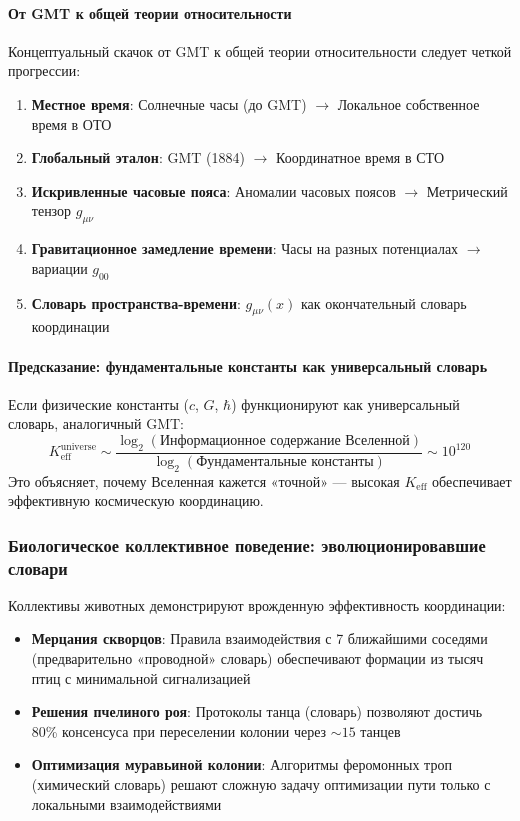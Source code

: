 \documentclass[11pt,a4paper]{article}
\begin{document}
	\paragraph{От GMT к общей теории относительности}
	Концептуальный скачок от GMT к общей теории относительности следует четкой прогрессии:
	\begin{enumerate}
		\item \textbf{Местное время}: Солнечные часы (до GMT) $\rightarrow$ Локальное собственное время в ОТО
		\item \textbf{Глобальный эталон}: GMT (1884) $\rightarrow$ Координатное время в СТО
		\item \textbf{Искривленные часовые пояса}: Аномалии часовых поясов $\rightarrow$ Метрический тензор $g_{\mu\nu}$
		\item \textbf{Гравитационное замедление времени}: Часы на разных потенциалах $\rightarrow$ вариации $g_{00}$
		\item \textbf{Словарь пространства-времени}: $g_{\mu\nu}(x)$ как окончательный словарь координации
	\end{enumerate}
	
	\paragraph{Предсказание: фундаментальные константы как универсальный словарь}
	Если физические константы ($c$, $G$, $\hbar$) функционируют как универсальный словарь, аналогичный GMT:
	\begin{equation}
		K_{\mathrm{eff}}^{\mathrm{universe}} \sim \frac{\log_2(\text{Информационное содержание Вселенной})}{\log_2(\text{Фундаментальные константы})} \sim 10^{120}
	\end{equation}
	Это объясняет, почему Вселенная кажется «точной» — высокая $K_{\mathrm{eff}}$ обеспечивает эффективную космическую координацию.
	
	\subsubsection{Биологическое коллективное поведение: эволюционировавшие словари}
	Коллективы животных демонстрируют врожденную эффективность координации:
	\begin{itemize}
		\item \textbf{Мерцания скворцов}: Правила взаимодействия с 7 ближайшими соседями (предварительно «проводной» словарь) обеспечивают формации из тысяч птиц с минимальной сигнализацией
		\item \textbf{Решения пчелиного роя}: Протоколы танца (словарь) позволяют достичь 80\% консенсуса при переселении колонии через $\sim 15$ танцев
		\item \textbf{Оптимизация муравьиной колонии}: Алгоритмы феромонных троп (химический словарь) решают сложную задачу оптимизации пути только с локальными взаимодействиями
	\end{itemize}
	
\end{document}
